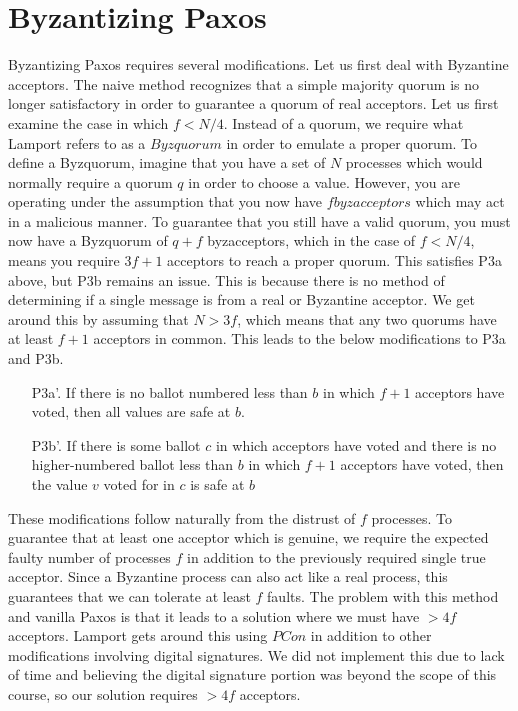\documentclass[conference]{IEEEtran}
\begin{document}
\section{Byzantizing Paxos}
Byzantizing Paxos requires several modifications. Let us first deal with Byzantine acceptors.
The naive method recognizes that a simple majority quorum is no longer satisfactory in order to guarantee a quorum of real acceptors. Let us first examine the case in which $f < N/4$. Instead of a quorum, we require what Lamport refers to as a $Byzquorum$ in order to emulate a proper quorum. To define a Byzquorum, imagine that you have a set of $N$ processes which would normally require a quorum $q$ in order to choose a value. However, you are operating under the assumption that you now have $f byzacceptors$ which may act in a malicious manner. To guarantee that you still have a valid quorum, you must now have a Byzquorum of $q + f$ byzacceptors, which in the case of $f < N/4$, means you require $3f + 1$ acceptors to reach a proper quorum.
This satisfies P3a above, but P3b remains an issue. This is because there is no method of determining if a single message is from a real or Byzantine acceptor. We get around this by assuming that $N > 3f$, which means that any two quorums have at least $f + 1$ acceptors in common. This leads to the below modifications to P3a and P3b.
\smallskip
\begin{enumerate}[leftmargin=4em]
\item[P3a'.] If there is no ballot numbered less than $b$ in which $f + 1$ acceptors have voted, then all values are safe at $b$.
\item[P3b'.] If there is some ballot $c$ in which acceptors have voted and there is no higher-numbered ballot less than $b$ in which $f + 1$ acceptors have voted, then the value $v$ voted for in $c$ is safe at $b$
\end{enumerate}
\smallskip

These modifications follow naturally from the distrust of $f$ processes. To guarantee that at least one acceptor which is genuine, we require the expected faulty number of processes $f$ in addition to the previously required single true acceptor. Since a Byzantine process can also act like a real process, this guarantees that we can tolerate at least $f$ faults. The problem with this method and vanilla Paxos is that it leads to a solution where we must have $>4f$ acceptors. Lamport gets around this using $PCon$ in addition to other modifications involving digital signatures. We did not implement this due to lack of time and believing the digital signature portion was beyond the scope of this course, so our solution requires $> 4f$ acceptors.
\end{document}
